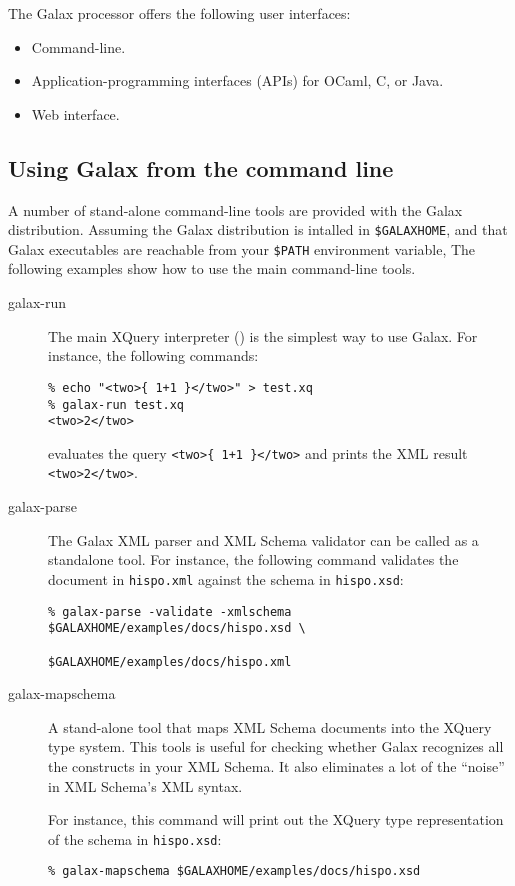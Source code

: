 The Galax processor offers the following user interfaces:

\begin{itemize}
\item Command-line.
\item Application-programming interfaces (APIs) for OCaml, C, or Java.
\item Web interface.
\end{itemize}

\subsection{Using Galax from the command line}

A number of stand-alone command-line tools are provided with the Galax
distribution. Assuming the Galax distribution is intalled in
\verb+$GALAXHOME+, and that Galax executables are reachable from your
\verb+$PATH+ environment variable, The following examples show how to
use the main command-line tools.

\begin{description}
\item[galax-run] The main XQuery interpreter () is the
simplest way to use Galax. For instance, the following commands:
\begin{verbatim}
% echo "<two>{ 1+1 }</two>" > test.xq
% galax-run test.xq
<two>2</two>
\end{verbatim}
evaluates the query \verb|<two>{ 1+1 }</two>| and prints the XML
result \verb|<two>2</two>|.

\item[galax-parse] The Galax XML parser and XML Schema validator can
  be called as a standalone tool. For instance, the following command
  validates the document in \texttt{hispo.xml} against the schema in
  \texttt{hispo.xsd}:
\begin{verbatim}
% galax-parse -validate -xmlschema $GALAXHOME/examples/docs/hispo.xsd \
                                   $GALAXHOME/examples/docs/hispo.xml 
\end{verbatim}

\item[galax-mapschema] A stand-alone tool that maps XML Schema documents into the XQuery
  type system.   This tools is useful for checking whether Galax
  recognizes all the constructs in your XML Schema.  It also eliminates a lot of the
  ``noise'' in XML Schema's XML syntax. 

For instance, this command will print out the XQuery type
representation of the schema in \texttt{hispo.xsd}: 
\begin{verbatim}
% galax-mapschema $GALAXHOME/examples/docs/hispo.xsd 
\end{verbatim}
\end{description}

